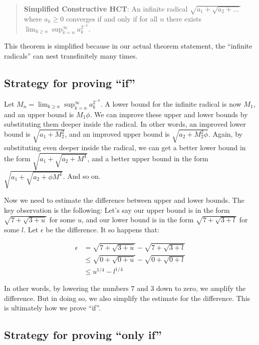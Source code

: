 \documentclass[
]{article}
\theoremstyle{theorem}
\theoremstyle{lemma}
\theoremstyle{corollary}
\theoremstyle{remark}
\theoremstyle{definition}
\begin{document}
\begin{quote}
\textbf{Simplified Constructive HCT}: An infinite radical \(\sqrt{a_1 + \sqrt{a_2 + \dots}}\) where \(a_k \geq 0\) converges if and only if for all \(n\) there exists \(\lim_{k\geq n} \sup_{k=n}^\infty a_k^{2^{-k}}\).
\end{quote}

This theorem is simplified because in our actual theorem statement, the ``infinite radicals'' can nest transfinitely many times.

\hypertarget{strategy-for-proving-if}{%
\subsection{Strategy for proving ``if''}\label{strategy-for-proving-if}}

Let \(M_n = \lim_{k\geq n} \sup_{k=n}^\infty a_k^{2^{-k}}\). A lower bound for the infinite radical is now \(M_1\), and an upper bound is \(M_1 \phi\). We can improve these upper and lower bounds by substituting them deeper inside the radical. In other words, an improved lower bound is \(\sqrt{a_1 + M_2^2}\), and an improved upper bound is \(\sqrt{a_2 + M_2^2 \phi}\). Again, by substituting even deeper inside the radical, we can get a better lower bound in the form \(\sqrt{a_1 + \sqrt{a_2 + M^4}}\), and a better upper bound in the form \(\sqrt{a_1 + \sqrt{a_2 + \phi M^4}}\). And so on.

Now we need to estimate the difference between upper and lower bounds. The key observation is the following: Let's say our upper bound is in the form \(\sqrt{7 + \sqrt{3 + u}}\) for some \(u\), and our lower bound is in the form \(\sqrt{7 + \sqrt{3 + l}}\) for some \(l\). Let \(\epsilon\) be the difference. It so happens that:

\[\begin{aligned}
\epsilon &= \sqrt{7 + \sqrt{3 + u}} - \sqrt{7 + \sqrt{3 + l}} \\
&\leq \sqrt{0 + \sqrt{0 + u}} - \sqrt{0 + \sqrt{0 + l}} \\
&\leq u^{1/4} - l^{1/4}
\end{aligned}\]

In other words, by lowering the numbers \(7\) and \(3\) down to zero, we amplify the difference. But in doing so, we also simplify the estimate for the difference. This is ultimately how we prove ``if''.

\hypertarget{strategy-for-proving-only-if}{%
\subsection{Strategy for proving ``only if''}\label{strategy-for-proving-only-if}}
\end{document}
